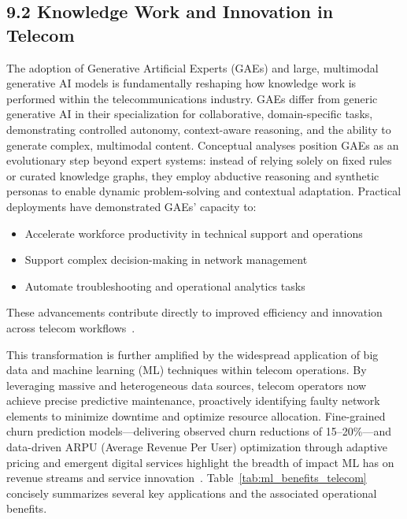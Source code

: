 \documentclass[11pt]{article}
\begin{document}
\subsection{9.2 Knowledge Work and Innovation in Telecom}

The adoption of Generative Artificial Experts (GAEs) and large, multimodal generative AI models is fundamentally reshaping how knowledge work is performed within the telecommunications industry. GAEs differ from generic generative AI in their specialization for collaborative, domain-specific tasks, demonstrating controlled autonomy, context-aware reasoning, and the ability to generate complex, multimodal content. Conceptual analyses position GAEs as an evolutionary step beyond expert systems: instead of relying solely on fixed rules or curated knowledge graphs, they employ abductive reasoning and synthetic personas to enable dynamic problem-solving and contextual adaptation. Practical deployments have demonstrated GAEs' capacity to:

\begin{itemize}
    \item Accelerate workforce productivity in technical support and operations
    \item Support complex decision-making in network management
    \item Automate troubleshooting and operational analytics tasks
\end{itemize}

\noindent These advancements contribute directly to improved efficiency and innovation across telecom workflows~\cite{ref2, ref15, ref8, ref18}.

This transformation is further amplified by the widespread application of big data and machine learning (ML) techniques within telecom operations. By leveraging massive and heterogeneous data sources, telecom operators now achieve precise predictive maintenance, proactively identifying faulty network elements to minimize downtime and optimize resource allocation. Fine-grained churn prediction models—delivering observed churn reductions of 15–20\%—and data-driven ARPU (Average Revenue Per User) optimization through adaptive pricing and emergent digital services highlight the breadth of impact ML has on revenue streams and service innovation~\cite{ref19, ref29}. Table~\ref{tab:ml_benefits_telecom} concisely summarizes several key applications and the associated operational benefits.
\end{document}
